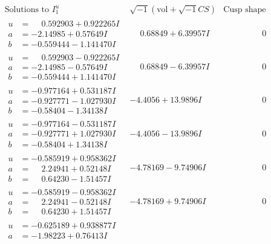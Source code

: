 \documentclass[1p]{elsarticle_modified}
\theoremstyle{definition}
\newcommand{\I}{\sqrt{-1}}
\begin{document}
$$\begin{array}{c|c|c}
\text{Solutions to }I^u_{1}& \I (\text{vol} + \sqrt{-1}CS) & \text{Cusp shape}\\
 \hline 
\begin{aligned}
u &= \phantom{-}0.592903 + 0.922265 I \\
a &= -2.14985 + 0.57649 I \\
b &= -0.559444 - 1.141470 I\end{aligned}
 & \phantom{-}0.68849 + 6.39957 I & \phantom{-0.000000 } 0 \\ \hline\begin{aligned}
u &= \phantom{-}0.592903 - 0.922265 I \\
a &= -2.14985 - 0.57649 I \\
b &= -0.559444 + 1.141470 I\end{aligned}
 & \phantom{-}0.68849 - 6.39957 I & \phantom{-0.000000 } 0 \\ \hline\begin{aligned}
u &= -0.977164 + 0.531187 I \\
a &= -0.927771 - 1.027930 I \\
b &= -0.58404 - 1.34138 I\end{aligned}
 & -4.4056 + 13.9896 I & \phantom{-0.000000 } 0 \\ \hline\begin{aligned}
u &= -0.977164 - 0.531187 I \\
a &= -0.927771 + 1.027930 I \\
b &= -0.58404 + 1.34138 I\end{aligned}
 & -4.4056 - 13.9896 I & \phantom{-0.000000 } 0 \\ \hline\begin{aligned}
u &= -0.585919 + 0.958362 I \\
a &= \phantom{-}2.24941 + 0.52148 I \\
b &= \phantom{-}0.64230 - 1.51457 I\end{aligned}
 & -4.78169 - 9.74906 I & \phantom{-0.000000 } 0 \\ \hline\begin{aligned}
u &= -0.585919 - 0.958362 I \\
a &= \phantom{-}2.24941 - 0.52148 I \\
b &= \phantom{-}0.64230 + 1.51457 I\end{aligned}
 & -4.78169 + 9.74906 I & \phantom{-0.000000 } 0 \\ \hline\begin{aligned}
u &= -0.625189 + 0.938877 I \\
a &= -1.98223 + 0.76413 I \\

\end{aligned}
\end{array}$$
\end{document}
